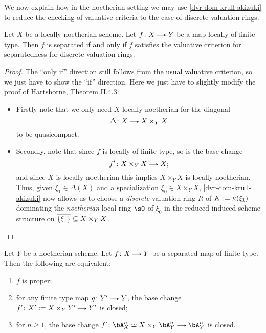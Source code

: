 \begin{nothing}
  \label{valcrit}
  We now explain how in the noetherian setting we may use
  \cref{dvr-dom-krull-akizuki} to reduce the checking of valuative
  criteria to the case of discrete valuation rings.

  \begin{subproposition}
    \label{valcrit-sep}
    Let $X$ be a locally noetherian scheme. Let $f \c X \to Y$ be a map locally of finite type. Then $f$ is separated if and only if $f$ satisfies the valuative criterion for separatedness for discrete valuation rings.

    \begin{proof}
      The ``only if'' direction still follows from the usual valuative criterion, so we just have to show the ``if'' direction. Here we just have to slightly modify the proof of Hartshorne, Theorem II.4.3:
      \begin{itemize}
      \item Firstly note that we only need $X$ locally noetherian for the diagonal
        \[
          \Delta \c X \to X \times_Y X
        \]
        to be quasicompact.
      \item Secondly, note that since $f$ is locally of finite type, so is the base change
        \[
          f' \c X \times_Y X \to X;
        \]
        and since $X$ is locally noetherian this implies $X \times_Y X$ is locally noetherian. Thus, given $\xi_1 \in \Delta(X)$ and a specialization $\xi_0 \in X \times_Y X$, \cref{dvr-dom-krull-akizuki} now allows us to choose a \emph{discrete} valuation ring $R$ of $K \mathrel{:=} \kappa(\xi_1)$ dominating the \emph{noetherian} local ring $\sO$ of $\xi_0$ in the reduced induced scheme structure on $\overline{\{\xi_1\}} \subseteq X \times_Y X$. \qedhere
      \end{itemize}
    \end{proof}
  \end{subproposition}

  \begin{sublemma}
    \label{valcrit-chow}
    Let $Y$ be a noetherian scheme. Let $f \c X \to Y$ be a separated map of finite type. Then the following are equivalent:
    \begin{enumerate}
    \item \label{valcrit-chow-univ} $f$ is proper;
    \item \label{valcrit-chow-fin} for any finite type map $g \c Y' \to Y$, the base change $f' \c X' \ce X \times_Y Y'\to Y'$ is closed;
    \item \label{valcrit-chow-aff} for $n \ge 1$, the base change $f' \c \bA^n_X \iso X \times_Y \bA^n_Y \to \bA^n_Y$ is closed.
    \end{enumerate}


\end{sublemma}
\end{nothing}
